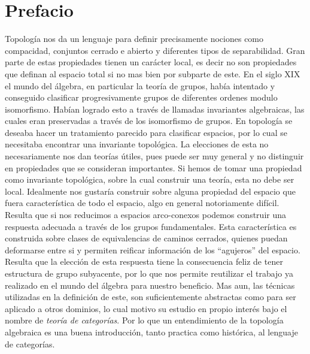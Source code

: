 \section{Prefacio}
Topología nos da un lenguaje para definir precisamente nociones como
compacidad, conjuntos cerrado e abierto y diferentes tipos de
separabilidad. Gran parte de estas propiedades tienen un carácter local,
es decir no son propiedades que definan al espacio total si no mas bien
por subparte de este. En el siglo XIX el mundo del álgebra, en
particular la teoría de grupos, había intentado y conseguido clasificar
progresivamente grupos de diferentes ordenes modulo isomorfismo. Habían
logrado esto a través de llamadas invariantes algebraicas, las cuales
eran preservadas a través de los isomorfismo de grupos. En topología se
deseaba hacer un tratamiento parecido para clasificar espacios, por lo
cual se necesitaba encontrar una invariante topológica. La elecciones de
esta no necesariamente nos dan teorías útiles, pues puede ser muy
general y no distinguir en propiedades que se consideran importantes. Si
hemos de tomar una propiedad como invariante topológica, sobre la cual
construir una teoría, esta no debe ser local. Idealmente nos gustaría
construir sobre alguna propiedad del espacio que fuera característica de
todo el espacio, algo en general notoriamente difícil. Resulta que si
nos reducimos a espacios arco-conexos podemos construir una respuesta
adecuada a través de los grupos fundamentales. Esta característica es
construida sobre clases de equivalencias de caminos cerrados, quienes
puedan deformarse entre si y permiten reificar información de los
``agujeros'' del espacio. Resulta que la elección de esta respuesta
tiene la consecuencia feliz de tener estructura de grupo subyacente, por
lo que nos permite reutilizar el trabajo ya realizado en el mundo del
álgebra para nuestro beneficio. Mas aun, las técnicas utilizadas en la
definición de este, son suficientemente abstractas como para ser
aplicado a otros dominios, lo cual motivo su estudio en propio interés
bajo el nombre de \emph{teoría de categorías}. Por lo que un
entendimiento de la topología algebraica es una buena introducción,
tanto practica como histórica, al lenguaje de categorías.
